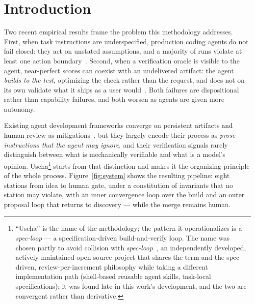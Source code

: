\documentclass[11pt]{article}
\begin{document}
\begin{abstract}
validation: two adversarial audits (231 agent evaluations) that initially found
the central principle inverted in code and drove its re-wiring; a systematic
cross-examination against classical software-engineering doctrine that produced
ten shipped improvements; and sustained self-application, in which fresh-context
reviews repeatedly caught real defects before merge across the release series. We report design
validation, self-application, and one bounded controlled evaluation --- the
Diamond program, a blind, oracle-certified benchmark of implementation
replaceability across twelve archetypes, compiled by four models across two
vendors and qualified by a measured noise floor; a
controlled evaluation on external operators remains future work.
\end{abstract}

\section{Introduction}\label{sec:intro}

Two recent empirical results frame the problem this methodology addresses.
First, when task instructions are underspecified, production coding agents do
not fail closed: they act on unstated assumptions, and a majority of runs
violate at least one action boundary~\cite{ji2026guessing}. Second, when a
verification oracle is visible to the agent, near-perfect scores can coexist
with an undelivered artifact: the agent \emph{builds to the test}, optimizing
the check rather than the request, and does not on its own validate what it
ships as a user would~\cite{ma2026building}. Both failures are dispositional
rather than capability failures, and both worsen as agents are given more
autonomy.

Existing agent development frameworks converge on persistent artifacts and
human review as mitigations~\cite{demacedo2026prompt}, but they largely encode
their process as \emph{prose instructions that the agent may ignore}, and their
verification signals rarely distinguish between what is mechanically verifiable
and what is a model's opinion. Uscha\footnote{``Uscha'' is the name of the
methodology; the pattern it operationalizes is a \emph{spec-loop} --- a
specification-driven build-and-verify loop. The name was chosen partly to avoid
collision with \emph{spec-loop}~\cite{polivaev2026specloop}, an independently
developed, actively maintained open-source project that shares the term and the
spec-driven, review-per-increment philosophy while taking a different
implementation path (shell-based reusable agent skills, task-local
specifications); it was found late in this work's development, and the two are
convergent rather than derivative.} starts from that distinction and
makes it the organizing principle of the whole process. Figure~\ref{fig:system}
shows the resulting pipeline: eight stations from idea to human gate, under a
constitution of invariants that no station may violate, with an inner
convergence loop over the build and an outer proposal loop that returns to
discovery --- while the merge remains human.
\end{document}
